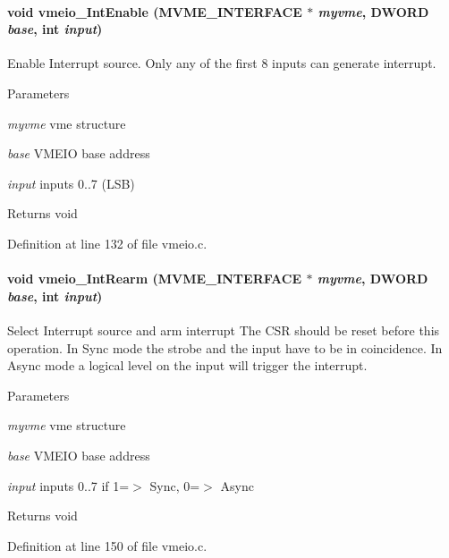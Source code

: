 \paragraph[{vmeio\_\-IntEnable}]{\setlength{\rightskip}{0pt plus 5cm}void vmeio\_\-IntEnable ({\bf MVME\_\-INTERFACE} $\ast$ {\em myvme}, \/  {\bf DWORD} {\em base}, \/  int {\em input})}\hfill\label{vmeio_8c_a435b8c9a42cccfa95a10ae2b6030f416}
Enable Interrupt source. Only any of the first 8 inputs can generate interrupt. 
\begin{DoxyParams}{Parameters}
\item[{\em myvme}]vme structure \item[{\em base}]VMEIO base address \item[{\em input}]inputs 0..7 (LSB) \end{DoxyParams}
\begin{DoxyReturn}{Returns}
void 
\end{DoxyReturn}


Definition at line 132 of file vmeio.c.
\paragraph[{vmeio\_\-IntRearm}]{\setlength{\rightskip}{0pt plus 5cm}void vmeio\_\-IntRearm ({\bf MVME\_\-INTERFACE} $\ast$ {\em myvme}, \/  {\bf DWORD} {\em base}, \/  int {\em input})}\hfill\label{vmeio_8c_a5d16a82b1b6620fc8c2622682c32182b}
Select Interrupt source and arm interrupt The CSR should be reset before this operation. In Sync mode the strobe and the input have to be in coincidence. In Async mode a logical level on the input will trigger the interrupt. 
\begin{DoxyParams}{Parameters}
\item[{\em myvme}]vme structure \item[{\em base}]VMEIO base address \item[{\em input}]inputs 0..7 if 1=$>$ Sync, 0=$>$ Async \end{DoxyParams}
\begin{DoxyReturn}{Returns}
void 
\end{DoxyReturn}


Definition at line 150 of file vmeio.c.
